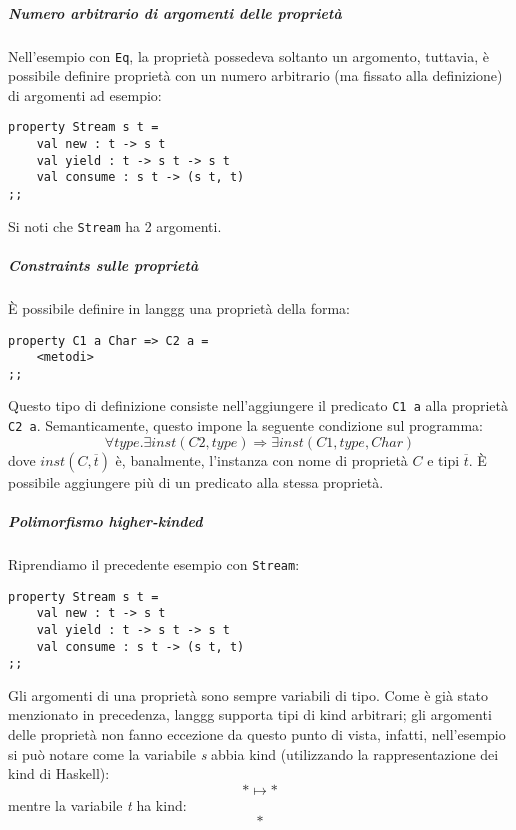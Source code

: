 \documentclass[10pt,a4paper]{article}
\begin{document}
\subparagraph{Numero arbitrario di argomenti delle proprietà}
Nell'esempio con \texttt{Eq}, la proprietà possedeva soltanto un argomento, tuttavia, è possibile definire proprietà
con un numero arbitrario (ma fissato alla definizione) di argomenti ad esempio:
\begin{lstlisting}
property Stream s t =
    val new : t -> s t
    val yield : t -> s t -> s t
    val consume : s t -> (s t, t)
;;
\end{lstlisting}
Si noti che \texttt{Stream} ha 2 argomenti.

\subparagraph{Constraints sulle proprietà}
\`E possibile definire in langgg una proprietà della forma:
\begin{lstlisting}
property C1 a Char => C2 a =
    <metodi>
;;
\end{lstlisting}
Questo tipo di definizione consiste nell'aggiungere il predicato \texttt{C1 a} alla proprietà \texttt{C2 a}.
Semanticamente, questo impone la seguente condizione sul programma:
    \[ \forall type . \exists inst(C2, type) \Longrightarrow \exists inst(C1, type, Char) \]
dove $ inst(C, \overline{t}) $ è, banalmente, l'instanza con nome di proprietà $ C $ e tipi $ \overline{t} $. \`E
possibile aggiungere più di un predicato alla stessa proprietà.

\subparagraph{Polimorfismo higher-kinded}
Riprendiamo il precedente esempio con \texttt{Stream}:
\begin{lstlisting}
property Stream s t =
    val new : t -> s t
    val yield : t -> s t -> s t
    val consume : s t -> (s t, t)
;;
\end{lstlisting}
Gli argomenti di una proprietà sono sempre variabili di tipo. Come è già stato menzionato in precedenza, langgg supporta
tipi di kind arbitrari; gli argomenti delle proprietà non fanno eccezione da questo punto di vista, infatti, nell'esempio
si può notare come la variabile \textit{s} abbia kind (utilizzando la rappresentazione dei kind di Haskell):
    \[ * \mapsto * \]
mentre la variabile \textit{t} ha kind:
   \[ * \]
\end{document}
